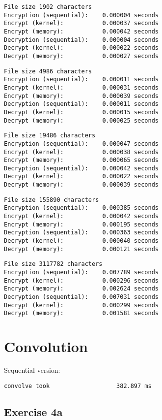 \documentclass[a4paper]{article}
\begin{document}
\begin{verbatim}
File size 1902 characters
Encryption (sequential):    0.000004 seconds
Encrypt (kernel):           0.000037 seconds
Encrypt (memory):           0.000042 seconds
Decryption (sequential):    0.000004 seconds
Decrypt (kernel):           0.000022 seconds
Decrypt (memory):           0.000027 seconds
\end{verbatim}
\begin{verbatim}
File size 4986 characters
Encryption (sequential):    0.000011 seconds
Encrypt (kernel):           0.000031 seconds
Encrypt (memory):           0.000039 seconds
Decryption (sequential):    0.000011 seconds
Decrypt (kernel):           0.000015 seconds
Decrypt (memory):           0.000025 seconds
\end{verbatim}
\begin{verbatim}
File size 19486 characters
Encryption (sequential):    0.000047 seconds
Encrypt (kernel):           0.000038 seconds
Encrypt (memory):           0.000065 seconds
Decryption (sequential):    0.000042 seconds
Decrypt (kernel):           0.000022 seconds
Decrypt (memory):           0.000039 seconds
\end{verbatim}
\begin{verbatim}
File size 155890 characters
Encryption (sequential):    0.000385 seconds
Encrypt (kernel):           0.000042 seconds
Encrypt (memory):           0.000195 seconds
Decryption (sequential):    0.000363 seconds
Decrypt (kernel):           0.000040 seconds
Decrypt (memory):           0.000121 seconds
\end{verbatim}
\begin{verbatim}
File size 3117782 characters
Encryption (sequential):    0.007789 seconds
Encrypt (kernel):           0.000296 seconds
Encrypt (memory):           0.002624 seconds
Decryption (sequential):    0.007031 seconds
Decrypt (kernel):           0.000299 seconds
Decrypt (memory):           0.001581 seconds
\end{verbatim}

\section{Convolution}

Sequential version:

\begin{verbatim}
convolve took                   382.897 ms
\end{verbatim}

\subsection{Exercise 4a}
\end{document}

